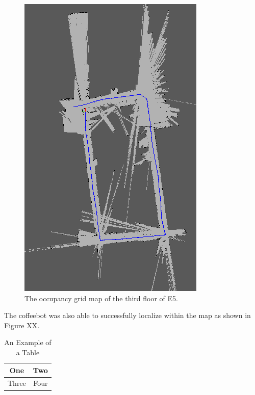 \documentclass[letterpaper, 10 pt, conference]{ieeeconf}  %
\begin{document}
	\begin{figure}[!ht]
		\centering
		\includegraphics[width=1.0\columnwidth]{Figures/3rd_occupancy_grid}
		\caption{The occupancy grid map of the third floor of E5.}
		\label{third_occ_grid}
	\end{figure}

The coffeebot was also able to successfully localize within the map as shown in Figure XX.

\begin{table}[h]
\caption{An Example of a Table}
\label{table_example}
\begin{center}
\begin{tabular}{|c||c|}
\hline
One & Two\\
\hline
Three & Four\\
\hline
\end{tabular}
\end{center}
\end{table}
\end{document}
